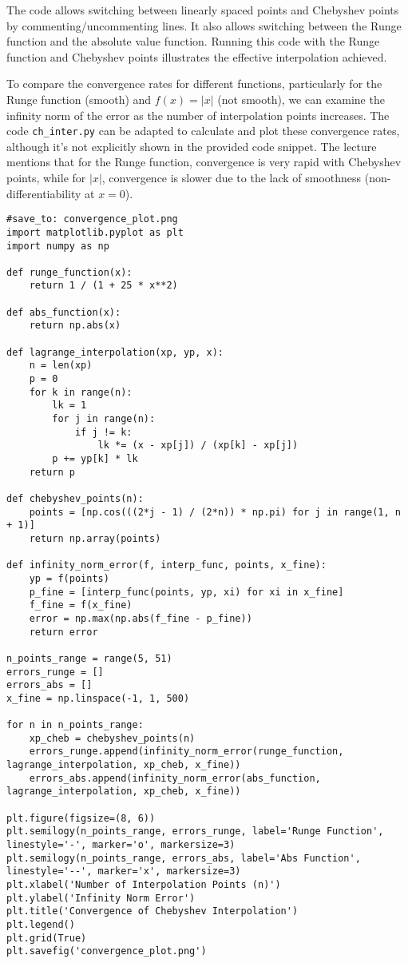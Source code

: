 \documentclass{article}
\begin{document}
The code allows switching between linearly spaced points and Chebyshev points by commenting/uncommenting lines. It also allows switching between the Runge function and the absolute value function. Running this code with the Runge function and Chebyshev points illustrates the effective interpolation achieved.

To compare the convergence rates for different functions, particularly for the Runge function (smooth) and $f(x) = |x|$ (not smooth), we can examine the infinity norm of the error as the number of interpolation points increases.  The code \texttt{ch\_inter.py} can be adapted to calculate and plot these convergence rates, although it's not explicitly shown in the provided code snippet.  The lecture mentions that for the Runge function, convergence is very rapid with Chebyshev points, while for $|x|$, convergence is slower due to the lack of smoothness (non-differentiability at $x=0$).

\begin{verbatim}
#save_to: convergence_plot.png
import matplotlib.pyplot as plt
import numpy as np

def runge_function(x):
    return 1 / (1 + 25 * x**2)

def abs_function(x):
    return np.abs(x)

def lagrange_interpolation(xp, yp, x):
    n = len(xp)
    p = 0
    for k in range(n):
        lk = 1
        for j in range(n):
            if j != k:
                lk *= (x - xp[j]) / (xp[k] - xp[j])
        p += yp[k] * lk
    return p

def chebyshev_points(n):
    points = [np.cos(((2*j - 1) / (2*n)) * np.pi) for j in range(1, n + 1)]
    return np.array(points)

def infinity_norm_error(f, interp_func, points, x_fine):
    yp = f(points)
    p_fine = [interp_func(points, yp, xi) for xi in x_fine]
    f_fine = f(x_fine)
    error = np.max(np.abs(f_fine - p_fine))
    return error

n_points_range = range(5, 51)
errors_runge = []
errors_abs = []
x_fine = np.linspace(-1, 1, 500)

for n in n_points_range:
    xp_cheb = chebyshev_points(n)
    errors_runge.append(infinity_norm_error(runge_function, lagrange_interpolation, xp_cheb, x_fine))
    errors_abs.append(infinity_norm_error(abs_function, lagrange_interpolation, xp_cheb, x_fine))

plt.figure(figsize=(8, 6))
plt.semilogy(n_points_range, errors_runge, label='Runge Function', linestyle='-', marker='o', markersize=3)
plt.semilogy(n_points_range, errors_abs, label='Abs Function', linestyle='--', marker='x', markersize=3)
plt.xlabel('Number of Interpolation Points (n)')
plt.ylabel('Infinity Norm Error')
plt.title('Convergence of Chebyshev Interpolation')
plt.legend()
plt.grid(True)
plt.savefig('convergence_plot.png')
\end{verbatim}
\end{document}
